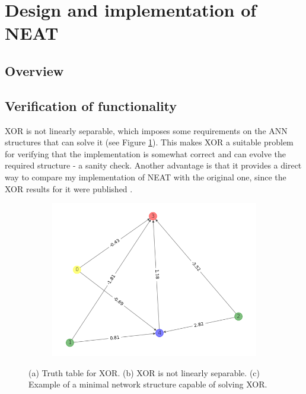 \newpage

\section{Design and implementation of NEAT}

\subsection{Overview}

\subsection{Verification of functionality}
XOR is not linearly separable, which imposes some requirements on the ANN structures that can solve it (see Figure \ref{xor}).
This makes XOR a suitable problem for verifying that the implementation is somewhat correct and can evolve
the required structure - a sanity check. Another advantage is that it provides a direct way to compare my
implementation of NEAT with the original one, since the XOR results for it were published \cite{neat_main}.


\begin{figure}[h!]
    \begin{mdframed}
    \begin{subfigure}[t]{0.3\textwidth}
        
        \caption{}
    \end{subfigure}
    \begin{subfigure}[t]{0.3\textwidth}
        
        \caption{}
    \end{subfigure}
    \begin{subfigure}[t]{0.4\textwidth}
        \includegraphics[scale=0.3]{resources/tex/xor/xor_weights.png}
        \caption{}
    \end{subfigure}
    \end{mdframed}
    \caption{(a) Truth table for XOR. (b) XOR is not linearly separable.
    (c) Example of a minimal network structure capable of solving XOR.}
    \label{xor}
\end{figure}


